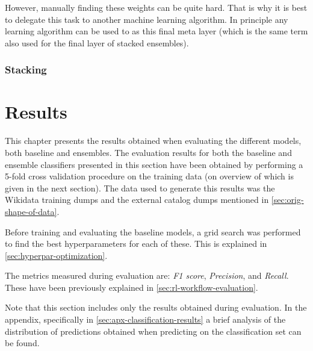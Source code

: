 \documentclass[epsfig,a4paper,11pt,titlepage,twoside,openany]{book}
\begin{document}
However, manually finding these weights can be quite hard. That is why it is best to delegate this task to another machine learning algorithm. In principle any learning algorithm can be used to as this final meta layer (which is the same term also used for the final layer of stacked ensembles). 



\subsection{Stacking}
\label{sec:ens-stacking}



\chapter{Results}
\label{chap:results}

This chapter presents the results obtained when evaluating the different models, both baseline and ensembles. The evaluation results for both the baseline and ensemble classifiers presented in this section have been obtained by performing a 5-fold cross validation procedure on the training data (on overview of which is given in the next section). The data used to generate this results was the Wikidata training dumps and the external catalog dumps mentioned in \autoref{sec:orig-shape-of-data}.

Before training and evaluating the baseline models, a grid search was performed to find the best hyperparameters for each of these. This is explained in \autoref{sec:hyperpar-optimization}.

The metrics measured during evaluation are: \textit{F1 score}, \textit{Precision}, and \textit{Recall}. These have been previously explained in \autoref{sec:rl-workflow-evaluation}. 

Note that this section includes only the results obtained during evaluation. In the appendix, specifically in \autoref{sec:apx-classification-results} a brief analysis of the distribution of predictions obtained when predicting on the classification set can be found.
\end{document}
